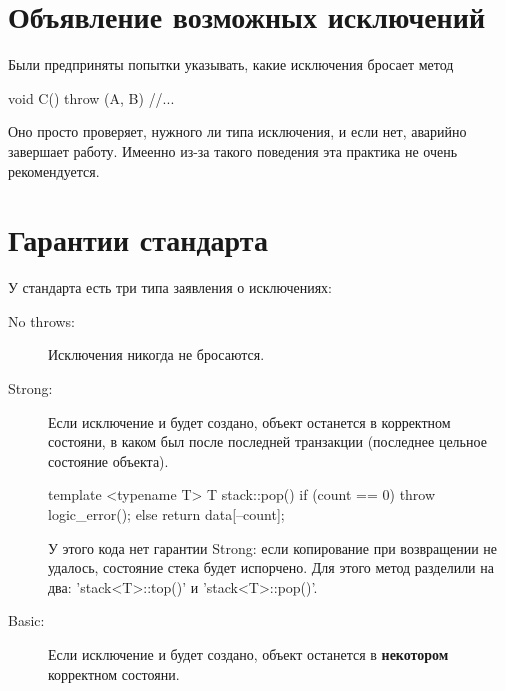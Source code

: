 \section{Объявление возможных исключений}

Были предприняты попытки указывать, какие исключения бросает метод
\begin{cppcode}
void C() throw (A, B) {
//...
}
\end{cppcode}

Оно просто проверяет, нужного ли типа исключения, и если нет, аварийно завершает работу. Имеенно из-за такого поведения эта практика не очень рекомендуется.

\section{Гарантии стандарта}

У стандарта есть три типа заявления о исключениях:
\begin{description}
\item[No throws:]
	Исключения никогда не бросаются.

\item[Strong:]
	Если исключение и будет создано, объект останется в корректном состояни, в каком был после последней транзакции (последнее цельное состояние объекта).
\begin{cppcode}
template <typename T>
T stack::pop() {
	if (count == 0)
		throw logic_error();
	else
		return data[--count];
}
\end{cppcode}
	У этого кода нет гарантии Strong: если копирование при возвращении не удалось, состояние стека будет испорчено.
	Для этого метод разделили на два: \cpp'stack<T>::top()' и \cpp'stack<T>::pop()'.

\item[Basic:]
	Если исключение и будет создано, объект останется в \textbf{некотором} корректном состояни.
\end{description}